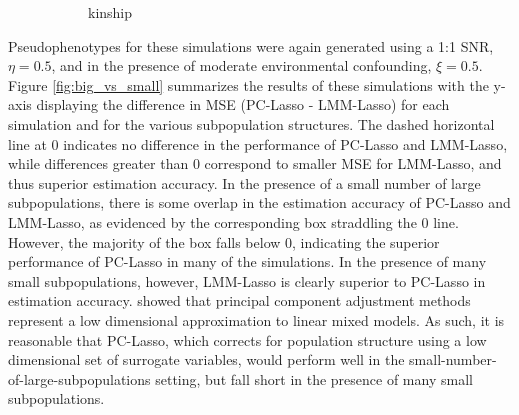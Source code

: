 \begin{figure}[H]
\begin{subfigure}{.8\textwidth}
  \caption{ kinship}
  \label{fig:vandy_groups}
\end{subfigure}
\caption{}
\label{fig:kinship}
\end{figure}

Pseudophenotypes for these simulations were again generated using a 1:1 SNR, $\eta = 0.5$, and in the presence of moderate environmental confounding, $\xi = 0.5$. Figure \ref{fig:big_vs_small} summarizes the results of these simulations with the y-axis displaying the difference in MSE (PC-Lasso - LMM-Lasso) for each simulation and for the various subpopulation structures. The dashed horizontal line at 0 indicates no difference in the performance of PC-Lasso and LMM-Lasso, while differences greater than 0 correspond to smaller MSE for LMM-Lasso, and thus superior estimation accuracy. In the presence of a small number of large subpopulations, there is some overlap in the estimation accuracy of PC-Lasso and LMM-Lasso, as evidenced by the corresponding box straddling the 0 line. However, the majority of the box falls below 0, indicating the superior performance of PC-Lasso in many of the simulations. In the presence of many small subpopulations, however, LMM-Lasso is clearly superior to PC-Lasso in estimation accuracy. \cite{hoffman2013correcting} showed that principal component adjustment methods represent a low dimensional approximation to linear mixed models. As such, it is reasonable that PC-Lasso, which corrects for population structure using a low dimensional set of surrogate variables, would perform well in the small-number-of-large-subpopulations setting, but fall short in the presence of many small subpopulations. \\



\\

